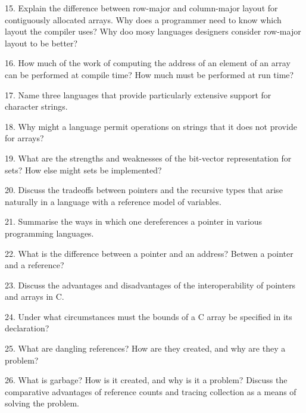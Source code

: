 15. Explain the difference between row-major and column-major layout for contiguously allocated arrays. Why does a programmer need to know which layout the compiler uses? Why doo mosy languages designers consider row-major layout to be better?

\filbreak
\vskip 1cm

16. How much of the work of computing the address of an element of an array can be performed at compile time? How much must be performed at run time?

\filbreak
\vskip 1cm

17. Name three languages that provide particularly extensive support for character strings.

\filbreak
\vskip 1cm

18. Why might a language permit operations on strings that it does not provide for arrays?

\filbreak
\vskip 1cm

19. What are the strengths and weaknesses of the bit-vector representation for sets? How else might sets be implemented?

\filbreak
\vskip 1cm

20. Discuss the tradeoffs between pointers and the recursive types that arise naturally in a language with a reference model of variables.

\filbreak
\vskip 1cm

21. Summarise the ways in which one dereferences a pointer in various programming languages.

\filbreak
\vskip 1cm

22. What is the difference between a pointer and an address? Betwen a pointer and a reference?

\filbreak
\vskip 1cm

23. Discuss the advantages and disadvantages of the interoperability of pointers and arrays in C.

\filbreak
\vskip 1cm

24. Under what circumstances must the bounds of a C array be specified in its declaration?

\filbreak
\vskip 1cm

25. What are dangling references? How are they created, and why are they a problem?

\filbreak
\vskip 1cm

26. What is garbage? How is it created, and why is it a problem? Discuss the comparative advantages of reference counts and tracing collection as a means of solving the problem.

